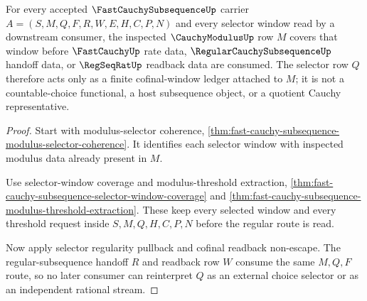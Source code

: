 \begin{theorem}
\label{thm:fast-cauchy-subsequence-modulus-selector-obligation}
For every accepted $\FastCauchySubsequenceUp$ carrier $A=(S,M,Q,F,R,W,E,H,C,P,N)$ and every selector window read by a downstream consumer, the inspected $\CauchyModulusUp$ row $M$ covers that window before $\FastCauchyUp$ rate data, $\RegularCauchySubsequenceUp$ handoff data, or $\RegSeqRatUp$ readback data are consumed. The selector row $Q$ therefore acts only as a finite cofinal-window ledger attached to $M$; it is not a countable-choice functional, a host subsequence object, or a quotient Cauchy representative.
\end{theorem}
\begin{proof}
Start with modulus-selector coherence, \autoref{thm:fast-cauchy-subsequence-modulus-selector-coherence}. It identifies each selector window with inspected modulus data already present in $M$.

Use selector-window coverage and modulus-threshold extraction, \autoref{thm:fast-cauchy-subsequence-selector-window-coverage} and \autoref{thm:fast-cauchy-subsequence-modulus-threshold-extraction}. These keep every selected window and every threshold request inside $S,M,Q,H,C,P,N$ before the regular route is read.

Now apply selector regularity pullback and cofinal readback non-escape. The regular-subsequence handoff $R$ and readback row $W$ consume the same $M,Q,F$ route, so no later consumer can reinterpret $Q$ as an external choice selector or as an independent rational stream.
\end{proof}

